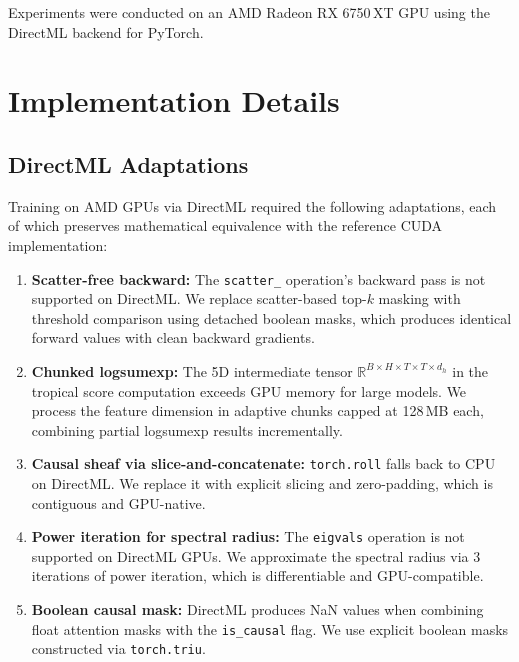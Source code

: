 \documentclass[11pt,a4paper]{article}
\newcommand{\R}{\mathbb{R}}
\begin{document}
Experiments were conducted on an AMD Radeon RX 6750\,XT GPU using
the DirectML backend for PyTorch.





\clearpage
\appendix

\section{Implementation Details}
\label{sec:impl}

\subsection{DirectML Adaptations}

Training on AMD GPUs via DirectML required the following adaptations,
each of which preserves mathematical equivalence with the reference
CUDA implementation:

\begin{enumerate}[leftmargin=*,nosep]
\item \textbf{Scatter-free backward:} The \texttt{scatter\_}
  operation's backward pass is not supported on DirectML.  We replace
  scatter-based top-$k$ masking with threshold comparison using
  detached boolean masks, which produces identical forward values with
  clean backward gradients.
\item \textbf{Chunked logsumexp:} The 5D intermediate tensor
  $\R^{B \times H \times T \times T \times d_h}$ in the tropical
  score computation exceeds GPU memory for large models.  We process
  the feature dimension in adaptive chunks capped at 128\,MB each,
  combining partial logsumexp results incrementally.
\item \textbf{Causal sheaf via slice-and-concatenate:}
  \texttt{torch.roll} falls back to CPU on DirectML.  We replace it
  with explicit slicing and zero-padding, which is contiguous and
  GPU-native.
\item \textbf{Power iteration for spectral radius:} The
  \texttt{eigvals} operation is not supported on DirectML GPUs.  We
  approximate the spectral radius via 3 iterations of power
  iteration, which is differentiable and GPU-compatible.
\item \textbf{Boolean causal mask:} DirectML produces NaN values
  when combining float attention masks with the \texttt{is\_causal}
  flag.  We use explicit boolean masks constructed via
  \texttt{torch.triu}.
\end{enumerate}
\end{document}
